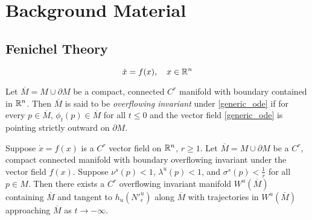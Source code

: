 \chapter{Background Material}
\section{Fenichel Theory}\label{sec:fenichel_theory}
\cite{wiggins1994normally}

\begin{equation}\label{generic_ode}
	\dot x = f(x), \quad x \in \mathbb{R}^n
\end{equation}

\begin{defn}
	Let \(\overline M = M \cup \partial M\) be a compact, connected \(C^r\) manifold with boundary contained in \(\mathbb{R}^n\). Then \(\overline M\) is said to be \emph{overflowing invariant} under \cref{generic_ode} if for every \(p \in \overline M\), \(\phi_t(p) \in \overline M\) for all \(t\leq 0\) and the vector field \cref{generic_ode} is pointing strictly outward on \(\partial M\).
\end{defn}

\begin{theorem}
	Suppose \(\dot x = f(x)\) is a \(C^r\) vector field on \(\mathbb{R}^n\), \(r\geq 1\). Let \(\overline M = M \cup \partial M\) be a \(C^r\), compact connected manifold with boundary overflowing invariant under the vector field \(f(x)\). Suppose \(\nu^s(p) < 1\), \(\lambda^u(p) < 1\), and \(\sigma^s(p) < \frac 1 r\) for all \(p\in M\). Then there exists a \(C^r\) overflowing invariant manifold \(W^u(\overline M)\) containing \(\overline M\) and tangent to \(h_u(N'^u_\epsilon )\) along \(\overline M\) with trajectories in \(W^u(\overline M)\) approaching \(\overline M\) as \(t\to -\infty\).
\end{theorem}

